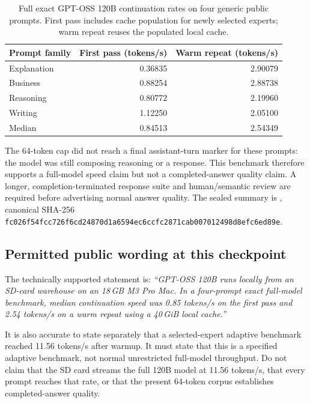 \begin{table}[ht]
\centering
\begin{tabular}{lrr}
\toprule
Prompt family & First pass (tokens/s) & Warm repeat (tokens/s) \\
\midrule
Explanation & 0.36835 & 2.90079 \\
Business & 0.88254 & 2.88738 \\
Reasoning & 0.80772 & 2.19960 \\
Writing & 1.12250 & 2.05100 \\
\midrule
Median & 0.84513 & 2.54349 \\
\bottomrule
\end{tabular}
\caption{Full exact GPT-OSS 120B continuation rates on four generic public
prompts. First pass includes cache population for newly selected experts;
warm repeat reuses the populated local cache.}
\label{tab:gptoss-normal-speed}
\end{table}

The 64-token cap did not reach a final assistant-turn marker for these prompts:
the model was still composing reasoning or a response. This benchmark therefore
supports a full-model speed claim but not a completed-answer quality claim.
A longer, completion-terminated response suite and human/semantic review are
required before advertising normal answer quality. The sealed summary is
,
canonical SHA-256
\texttt{fc026f54fcc726f6cd24870d1a6594ec6ccfc2871cab007012498d8efc6ed89e}.

\subsection{Permitted public wording at this checkpoint}
The technically supported statement is: \emph{``GPT-OSS 120B runs locally
from an SD-card warehouse on an 18\,GB M3 Pro Mac. In a four-prompt exact
full-model benchmark, median continuation speed was 0.85 tokens/s on the
first pass and 2.54 tokens/s on a warm repeat using a 40\,GiB local cache.''}

It is also accurate to state separately that a selected-expert adaptive
benchmark reached 11.56 tokens/s after warmup. It must state that this is a
specified adaptive benchmark, not normal unrestricted full-model throughput.
Do not claim that the SD card streams the full 120B model at 11.56 tokens/s,
that every prompt reaches that rate, or that the present 64-token corpus
establishes completed-answer quality.
